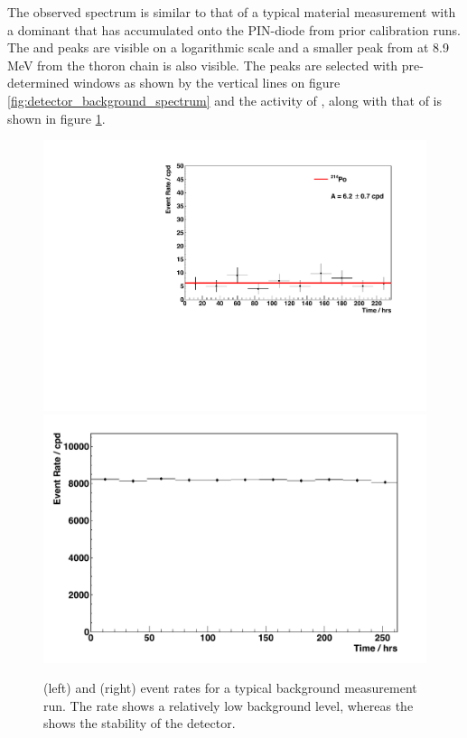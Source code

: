 The observed spectrum is similar to that of a typical material measurement with a dominant \PoTOZ{} that has accumulated onto the PIN-diode from prior calibration runs. The \PoTOE{} and \PoTOF{} peaks are visible on a logarithmic scale and a smaller peak from \PoTOT{} at 8.9 MeV from the thoron chain is also visible. The peaks are selected with pre-determined windows as shown by the vertical lines on figure \ref{fig:detector_background_spectrum} and the activity of \PoTOF{}, along with that of \PoTOZ{} is shown in figure \ref{fig:detector_background_rates}. 
%
\begin{figure}[t!]
    \centering
    \includegraphics[scale=0.43]{Chapter_4/Figures/det_background/Po214_det_background.pdf}
    \includegraphics[scale=0.43]{Chapter_4/Figures/det_background/Po210_det_background.pdf}
    \caption[\PoTOF{} and \PoTOZ{} event rates for a typical background measurement run.]
    {\PoTOF{} (left) and \PoTOZ{} (right) event rates for a typical background measurement run. The \PoTOF{} rate shows a relatively low background level, whereas the \PoTOZ{} shows the stability of the detector.}
    \label{fig:detector_background_rates}
\end{figure}
%

